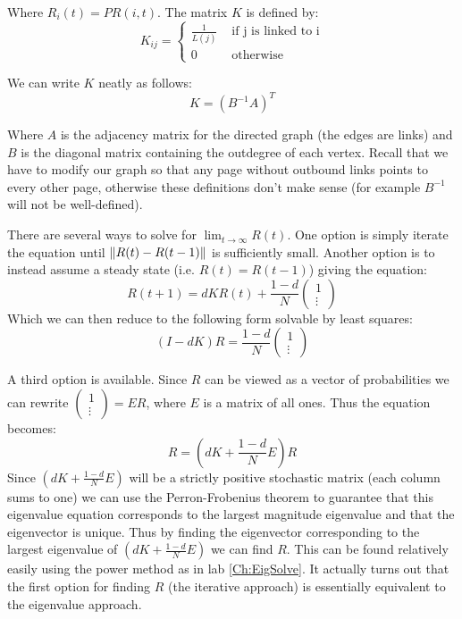 Where $R_i(t) = PR(i,t)$. The matrix $K$ is defined by:
\[
K_{ij} = \begin{cases} \frac{1}{L(j)} & \mbox{ if j is linked to i} \\ 0 & \mbox{ otherwise} \end{cases}
\]

We can write $K$ neatly as follows:
\[
K = (B^{-1}A)^T
\]

Where $A$ is the adjacency matrix for the directed graph (the edges are links) and $B$ is the diagonal matrix containing the outdegree of each vertex. Recall that we have to modify our graph so that any page without outbound links points to every other page, otherwise these definitions don't make sense (for example $B^{-1}$ will not be well-defined).

There are several ways to solve for $\lim_{t \to \infty} R(t)$. One option is simply iterate the equation until $\left\lVert R(t)-R(t-1)\right\rVert$ is sufficiently small. Another option is to instead assume a steady state (i.e. $R(t) = R(t-1)$) giving the equation:
\[
R(t+1) = d K R(t) + \frac{1-d}{N} \begin{pmatrix}1\\\vdots\end{pmatrix}
\]
Which we can then reduce to the following form solvable by least squares:
\[
(I-dK)R = \frac{1-d}{N} \begin{pmatrix}1\\\vdots\end{pmatrix}
\]

A third option is available. Since $R$ can be viewed as a vector of probabilities we can rewrite $\left(\begin{smallmatrix}1\\\vdots\end{smallmatrix}\right) = E R$, where $E$ is a matrix of all ones. Thus the equation becomes:
\[
R = (dK + \frac{1-d}{N}E)R
\]
Since $(dK + \frac{1-d}{N}E)$ will be a strictly positive stochastic matrix (each column sums to one) we can use the Perron-Frobenius theorem to guarantee that this eigenvalue equation corresponds to the largest magnitude eigenvalue and that the eigenvector is unique. Thus by finding the eigenvector corresponding to the largest eigenvalue of $(dK + \frac{1-d}{N}E)$ we can find $R$. This can be found relatively easily using the power method as in lab \ref{Ch:EigSolve}. It actually turns out that the first option for finding $R$ (the iterative approach) is essentially equivalent to the eigenvalue approach.

